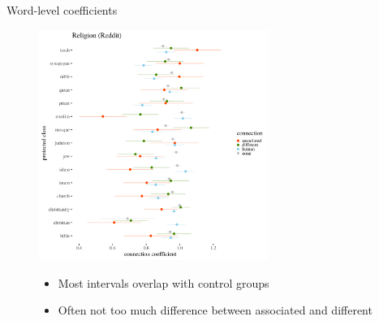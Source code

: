 \documentclass[
  10pt,
  ignorenonframetext,
  x11names, dvipsnames, bibspacing,natbib, table]{beamer}
\begin{document}
\begin{frame}{Word-level coefficients}
\protect\hypertarget{word-level-coefficients}{}
\begin{figure}[!htb]\centering
  \begin{minipage}{0.55\textwidth}
\includegraphics[width=7.5cm]{../../images/visReligionReddit.png}
\end{minipage}
\begin{minipage}{0.4\textwidth}\footnotesize

\vspace{-4cm}

   \begin{itemize}
   \item Most intervals overlap with control groups
   \item Often not too much difference between associated and different
   \end{itemize}
   \end{minipage}
\end{figure}
\end{frame}
\end{document}
